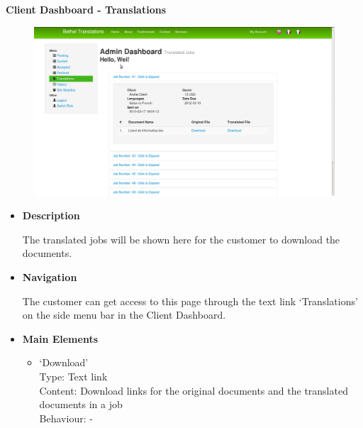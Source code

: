 \documentclass{l3proj}
\begin{document}
\textbf{Client Dashboard - Translations}
\begin{figure}[H]
\centering
\includegraphics[width=0.8\linewidth]{images/clientDashTranslations}
\vspace{-30pt}
\end{figure}

\begin{itemize}
\item \textbf{Description}

The translated jobs will be shown here for the customer to download the documents.

\item \textbf{Navigation}

The customer can get access to this page through the text link `Translations' on the side menu bar in the Client Dashboard.

\item \textbf{Main Elements}
\begin{itemize}

\item `Download'\\
Type: Text link\\
Content: Download links for the original documents and the translated documents in a job\\
Behaviour: -\\

\end{itemize}
\end{itemize}
\end{document}
